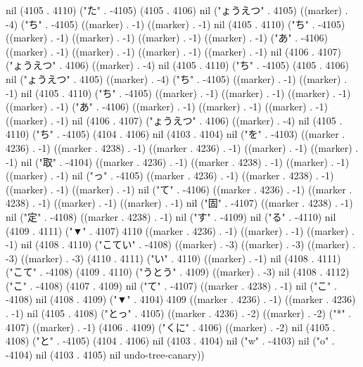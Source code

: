 nil (4105 . 4110) ("た" . -4105) (4105 . 4106) nil ("ょうえつ" . 4105) ((marker) . -4) ("ち" . -4105) ((marker) . -1) ((marker) . -1) nil (4105 . 4110) ("ち" . -4105) ((marker) . -1) ((marker) . -1) ((marker) . -1) ((marker) . -1) ("あ" . -4106) ((marker) . -1) ((marker) . -1) ((marker) . -1) ((marker) . -1) nil (4106 . 4107) ("ょうえつ" . 4106) ((marker) . -4) nil (4105 . 4110) ("ち" . -4105) (4105 . 4106) nil ("ょうえつ" . 4105) ((marker) . -4) ("ち" . -4105) ((marker) . -1) ((marker) . -1) nil (4105 . 4110) ("ち" . -4105) ((marker) . -1) ((marker) . -1) ((marker) . -1) ((marker) . -1) ("あ" . -4106) ((marker) . -1) ((marker) . -1) ((marker) . -1) ((marker) . -1) nil (4106 . 4107) ("ょうえつ" . 4106) ((marker) . -4) nil (4105 . 4110) ("ち" . -4105) (4104 . 4106) nil (4103 . 4104) nil ("を" . -4103) ((marker . 4236) . -1) ((marker . 4238) . -1) ((marker . 4236) . -1) ((marker) . -1) ((marker) . -1) nil ("取" . -4104) ((marker . 4236) . -1) ((marker . 4238) . -1) ((marker) . -1) ((marker) . -1) nil ("っ" . -4105) ((marker . 4236) . -1) ((marker . 4238) . -1) ((marker) . -1) ((marker) . -1) nil ("て" . -4106) ((marker . 4236) . -1) ((marker . 4238) . -1) ((marker) . -1) ((marker) . -1) nil ("固" . -4107) ((marker . 4238) . -1) nil ("定" . -4108) ((marker . 4238) . -1) nil ("す" . -4109) nil ("る" . -4110) nil (4109 . 4111) ("▼" . 4107) 4110 ((marker . 4236) . -1) ((marker) . -1) ((marker) . -1) nil (4108 . 4110) ("こてい" . -4108) ((marker) . -3) ((marker) . -3) ((marker) . -3) ((marker) . -3) (4110 . 4111) ("い" . 4110) ((marker) . -1) nil (4108 . 4111) ("こて" . -4108) (4109 . 4110) ("うとう" . 4109) ((marker) . -3) nil (4108 . 4112) ("こ" . -4108) (4107 . 4109) nil ("て" . -4107) ((marker . 4238) . -1) nil ("こ" . -4108) nil (4108 . 4109) ("▼" . 4104) 4109 ((marker . 4236) . -1) ((marker . 4236) . -1) nil (4105 . 4108) ("とっ" . 4105) ((marker . 4236) . -2) ((marker) . -2) ("*" . 4107) ((marker) . -1) (4106 . 4109) ("くに" . 4106) ((marker) . -2) nil (4105 . 4108) ("と" . -4105) (4104 . 4106) nil (4103 . 4104) nil ("w" . -4103) nil ("o" . -4104) nil (4103 . 4105) nil undo-tree-canary))
